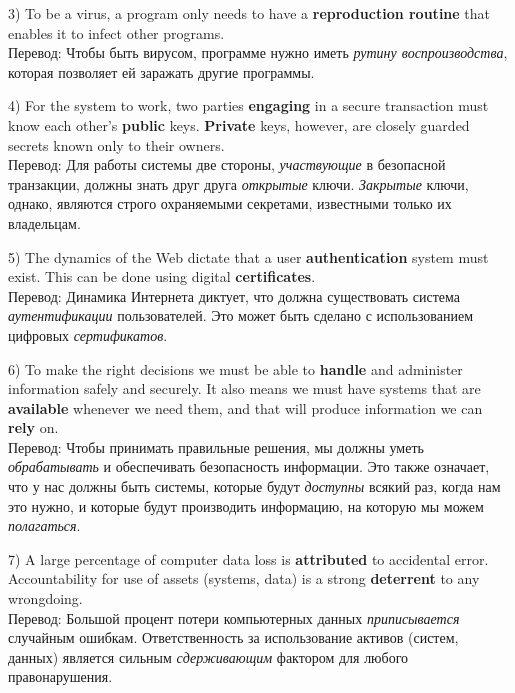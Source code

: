 	\par 3) To be a virus, a program only needs to have a \textbf{reproduction routine} that enables it to infect other programs.
	\\
	Перевод: Чтобы быть вирусом, программе нужно иметь \textit{рутину воспроизводства}, которая позволяет ей заражать другие программы.
	
	\par 4) For the system to work, two parties \textbf{engaging} in a secure transaction must know each other's \textbf{public} keys. \textbf{Private} keys, however, are closely guarded secrets known only to their owners.
	\\
	Перевод: Для работы системы две стороны, \textit{участвующие} в безопасной транзакции, должны знать друг друга \textit{открытые} ключи. \textit{Закрытые} ключи, однако, являются строго охраняемыми секретами, известными только их владельцам.
	
	\par 5) The dynamics of the Web dictate that a user \textbf{authentication} system must exist. This can be done using digital \textbf{certificates}.
	\\
	Перевод: Динамика Интернета диктует, что должна существовать система \textit{аутентификации} пользователей. Это может быть сделано с использованием цифровых \textit{сертификатов}.
	
	\par 6) To make the right decisions we must be able to \textbf{handle} and administer information safely and securely. It also means we must have systems that are \textbf{available} whenever we need them, and that will produce information we can \textbf{rely} on.
	\\
	Перевод: Чтобы принимать правильные решения, мы должны уметь \textit{обрабатывать} и обеспечивать безопасность информации. Это также означает, что у нас должны быть системы, которые будут \textit{доступны} всякий раз, когда нам это нужно, и которые будут производить информацию, на которую мы можем \textit{полагаться}.
	
	\par 7) A large percentage of computer data loss is \textbf{attributed} to accidental error. Accountability for use of assets (systems, data) is a strong \textbf{deterrent} to any wrongdoing.
	\\
	Перевод: Большой процент потери компьютерных данных \textit{приписывается} случайным ошибкам. Ответственность за использование активов (систем, данных) является сильным \textit{сдерживающим} фактором для любого правонарушения.
	
